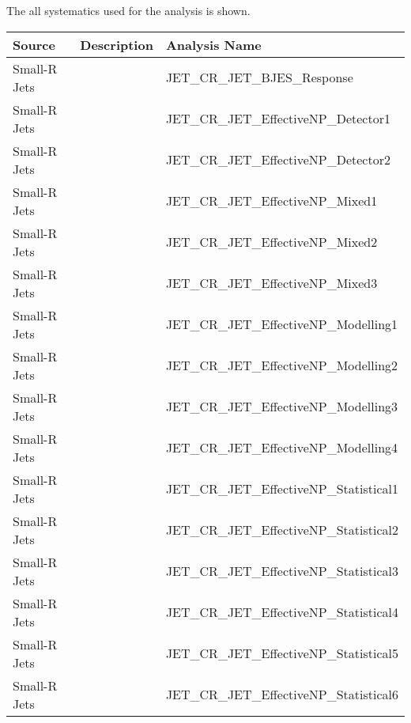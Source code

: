 
The all systematics used for the analysis is shown.
\begin{table}[!hp]
  \centering
  \footnotesize
  \begin{center}
    \begin{tabular}{|l|l|l|}
      \hline
      Source        & Description                     & Analysis Name                                       \\ \hline
      Small-R Jets  &             &  JET\_CR\_JET\_BJES\_Response                            \\
      Small-R Jets  &             &  JET\_CR\_JET\_EffectiveNP\_Detector1                    \\
      Small-R Jets  &             &  JET\_CR\_JET\_EffectiveNP\_Detector2                    \\
      Small-R Jets  &             &  JET\_CR\_JET\_EffectiveNP\_Mixed1                       \\
      Small-R Jets  &             &  JET\_CR\_JET\_EffectiveNP\_Mixed2                       \\
      Small-R Jets  &             &  JET\_CR\_JET\_EffectiveNP\_Mixed3                       \\
      Small-R Jets  &             &  JET\_CR\_JET\_EffectiveNP\_Modelling1                   \\
      Small-R Jets  &             &  JET\_CR\_JET\_EffectiveNP\_Modelling2                   \\
      Small-R Jets  &             &  JET\_CR\_JET\_EffectiveNP\_Modelling3                   \\
      Small-R Jets  &             &  JET\_CR\_JET\_EffectiveNP\_Modelling4                   \\
      Small-R Jets  &             &  JET\_CR\_JET\_EffectiveNP\_Statistical1                 \\
      Small-R Jets  &             &  JET\_CR\_JET\_EffectiveNP\_Statistical2                 \\
      Small-R Jets  &             &  JET\_CR\_JET\_EffectiveNP\_Statistical3                 \\
      Small-R Jets  &             &  JET\_CR\_JET\_EffectiveNP\_Statistical4                 \\
      Small-R Jets  &             &  JET\_CR\_JET\_EffectiveNP\_Statistical5                 \\
      Small-R Jets  &             &  JET\_CR\_JET\_EffectiveNP\_Statistical6                 \\

\end{tabular}
\end{center}
\end{table}
